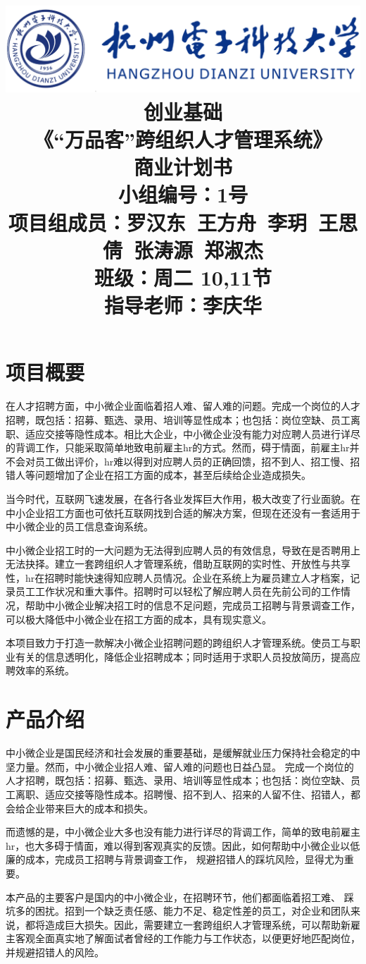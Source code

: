 \documentclass[UTF8]{ctexart}
\title{
	\includegraphics[scale = 0.8]{HDU.png}\\
    \vspace{1in}
    \textmd{ \Huge\textbf{创业基础}}\\
    \textmd{\textbf{《“万品客”跨组织人才管理系统》}}\\
    \textmd{\textbf{商业计划书}}\\
   	\vspace{3.5in}
   	\large{小组编号：1号}\\
	\textmd{项目组成员：罗汉东\ 王方舟\ 李玥\ 王思倩\ 张涛源\ 郑淑杰}\\
	\textmd{班级：周二 10,11节}\\
	\textmd{指导老师：李庆华 }\\
}
\begin{document}
\maketitle
\newpage
\tableofcontents
\newpage
\newpage\section{项目概要}
在人才招聘方面，中小微企业面临着招人难、留人难的问题。完成一个岗位的人才招聘，既包括：招募、甄选、录用、培训等显性成本；也包括：岗位空缺、员工离职、适应交接等隐性成本。相比大企业，中小微企业没有能力对应聘人员进行详尽的背调工作，只能采取简单地致电前雇主hr的方式。然而，碍于情面，前雇主hr并不会对员工做出评价，hr难以得到对应聘人员的正确回馈，招不到人、招工慢、招错人等问题增加了企业在招工方面的成本，甚至后续给企业造成损失。

当今时代，互联网飞速发展，在各行各业发挥巨大作用，极大改变了行业面貌。在中小企业招工方面也可依托互联网找到合适的解决方案，但现在还没有一套适用于中小微企业的员工信息查询系统。

中小微企业招工时的一大问题为无法得到应聘人员的有效信息，导致在是否聘用上无法抉择。建立一套跨组织人才管理系统，借助互联网的实时性、开放性与共享性，hr在招聘时能快速得知应聘人员情况。企业在系统上为雇员建立人才档案，记录员工工作状况和重大事件。招聘时可以轻松了解应聘人员在先前公司的工作情况，帮助中小微企业解决招工时的信息不足问题，完成员工招聘与背景调查工作，可以极大降低中小微企业在招工方面的成本，具有现实意义。

本项目致力于打造一款解决小微企业招聘问题的跨组织人才管理系统。使员工与职业有关的信息透明化，降低企业招聘成本；同时适用于求职人员投放简历，提高应聘效率的系统。
\newpage\section{产品介绍}
中小微企业是国民经济和社会发展的重要基础，是缓解就业压力保持社会稳定的中坚力量。然而，中小微企业招人难、留人难的问题也日益凸显。 完成一个岗位的人才招聘，既包括：招募、甄选、录用、培训等显性成本；也包括：岗位空缺、员工离职、适应交接等隐性成本。招聘慢、招不到人、招来的人留不住、招错人，都会给企业带来巨大的成本和损失。 

而遗憾的是，中小微企业大多也没有能力进行详尽的背调工作，简单的致电前雇主 hr，也大多碍于情面，难以得到客观真实的反馈。因此，如何帮助中小微企业以低廉的成本，完成员工招聘与背景调查工作， 规避招错人的踩坑风险，显得尤为重要。


本产品的主要客户是国内的中小微企业，在招聘环节，他们都面临着招工难、 踩坑多的困扰。招到一个缺乏责任感、能力不足、稳定性差的员工，对企业和团队来说，都将造成巨大损失。因此，需要建立一套跨组织人才管理系统，可以帮助新雇主客观全面真实地了解面试者曾经的工作能力与工作状态，以便更好地匹配岗位，并规避招错人的风险。
\end{document}
